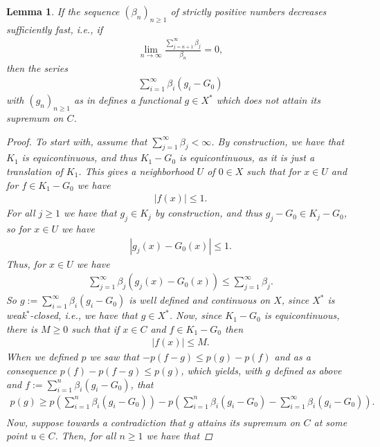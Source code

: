 \documentclass[10pt,twoside,openany,final]{memoir}
\theoremstyle{break}
\newtheorem{lemma}[section]{Lemma}
\theoremstyle{Break}
\begin{document}
\begin{lemma}\label{pryce 7}
If the sequence $(\beta_{n})_{n\geq 1}$ of strictly positive numbers decreases sufficiently fast, i.e., if 
\begin{align*}
\lim_{n \to \infty} \frac{\sum_{j=n+1}^{\infty} \beta_{j}}{\beta_{n}}=0,
\end{align*} 
then the series
\begin{align*}
\sum_{i=1}^\infty \beta_{i} (g_{i} - G_{0})
\end{align*}
with $(g_n)_{n \geq 1}$ as in  defines a functional $g \in X^*$ which does not attain its supremum on $C$.
\begin{proof}
To start with, assume that $\sum_{j=1}^\infty \beta_{j} < \infty$. By construction, we have that $K_{1}$ is equicontinuous, and thus $K_{1}-G_{0}$ is equicontinuous, as it is just a translation of $K_{1}$. This gives a neighborhood $U$ of $0 \in X$ such that for $x \in U$ and for $f \in K_{1}-G_{0}$ we have
\begin{align*}
|f(x)| \leq 1.
\end{align*}
For all $j \geq 1$ we have that $g_{j} \in K_{j}$ by construction, and thus $g_{j}-G_{0} \in K_{j}-G_{0}$, so for $x \in U$ we have
\begin{align*}
|g_{j}(x)-G_{0}(x)| \leq 1.
\end{align*}
Thus, for $x \in U$ we have
\begin{align*}
\sum_{j=1}^\infty \beta_{j} \left( g_{j}(x)-G_{0}(x) \right) \leq \sum_{j=1}^\infty \beta_{j}.
\end{align*}
So $g:=\sum_{i=1}^\infty \beta_{i} \left(g_{i} - G_{0}\right)$ is well defined and continuous on $X$, since $X^*$ is weak$^*$-closed, i.e., we have that $g \in X^*$. Now, since $K_{1}-G_{0}$ is equicontinuous, there is $M\geq 0$ such that if $x\in C$ and $f \in K_{1}-G_{0}$ then
\begin{align}
|f(x)| \leq M.
\end{align}
When we defined $p$ we saw that $-p(f-g) \leq p(g)-p(f)$ and as a consequence $p(f) -p(f-g) \leq p(g)$, which yields, with $g$ defined as above and $f:=\sum_{i=1}^n \beta_{i}(g_{i}-G_{0})$, that
\begin{align*}
p(g) \geq p\left(\sum_{i=1}^n \beta_{i} (g_{i}-G_{0}) \right) -p\left(\sum_{i=1}^n \beta_{i}(g_{i}-G_{0})-\sum_{i=1}^\infty \beta_{i}(g_{i}-G_{0})  \right). \tag{$\star$}\\
\end{align*} 
Now, suppose towards a contradiction that $g$ attains its supremum on $C$ at some point $u \in C$. Then, for all $n \geq 1$ we have that

\end{proof}
\end{lemma}
\end{document}
